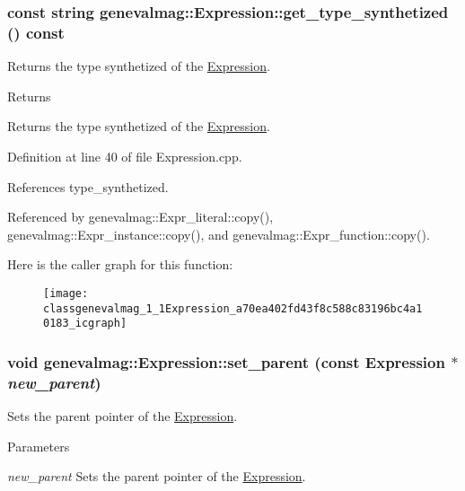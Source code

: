\hypertarget{classgenevalmag_1_1Expression_a70ea402fd43f8c588c83196bc4a10183}{
\subsubsection[{get\_\-type\_\-synthetized}]{\setlength{\rightskip}{0pt plus 5cm}const string genevalmag::Expression::get\_\-type\_\-synthetized () const}}
\label{classgenevalmag_1_1Expression_a70ea402fd43f8c588c83196bc4a10183}
Returns the type synthetized of the \hyperlink{classgenevalmag_1_1Expression}{Expression}. \begin{DoxyReturn}{Returns}

\end{DoxyReturn}
Returns the type synthetized of the \hyperlink{classgenevalmag_1_1Expression}{Expression}. 

Definition at line 40 of file Expression.cpp.



References type\_\-synthetized.



Referenced by genevalmag::Expr\_\-literal::copy(), genevalmag::Expr\_\-instance::copy(), and genevalmag::Expr\_\-function::copy().



Here is the caller graph for this function:\nopagebreak
\begin{figure}[H]
\begin{center}
\leavevmode
\texttt{[image: classgenevalmag\_1\_1Expression\_a70ea402fd43f8c588c83196bc4a10183\_icgraph]}
\end{center}
\end{figure}


\hypertarget{classgenevalmag_1_1Expression_acba3103fd864eacfefdecb88e597de1f}{
\subsubsection[{set\_\-parent}]{\setlength{\rightskip}{0pt plus 5cm}void genevalmag::Expression::set\_\-parent (const {\bf Expression} $\ast$ {\em new\_\-parent})}}
\label{classgenevalmag_1_1Expression_acba3103fd864eacfefdecb88e597de1f}
Sets the parent pointer of the \hyperlink{classgenevalmag_1_1Expression}{Expression}. 
\begin{DoxyParams}{Parameters}
\item[{\em new\_\-parent}]Sets the parent pointer of the \hyperlink{classgenevalmag_1_1Expression}{Expression}. \end{DoxyParams}


